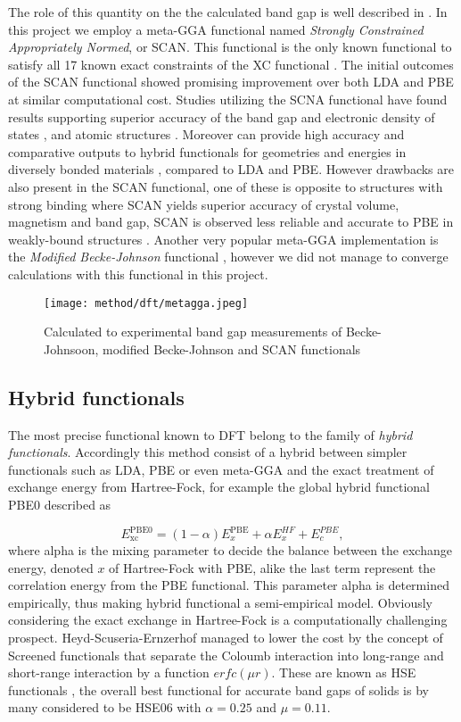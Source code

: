 The role of this quantity on the the calculated band gap is well described in \cite{xc_kineticEnergy}. In this project we employ a meta-GGA functional named \textit{Strongly Constrained Appropriately Normed}, or SCAN. This functional is the only known functional to satisfy all 17 known exact constraints of the XC functional \cite{scan}. The initial outcomes of the SCAN functional showed promising improvement over both LDA and PBE at similar computational cost. Studies utilizing the SCNA functional have found results supporting superior accuracy of the band gap and electronic density of states \cite{scan_pbe}, and atomic structures \cite{scan_hse06}. Moreover can provide high accuracy and comparative outputs to hybrid functionals for geometries and energies in diversely bonded materials \cite{scan_divbond}, compared to LDA and PBE. However drawbacks are also present in the SCAN functional, one of these is opposite to structures with strong binding where SCAN yields superior accuracy of crystal volume, magnetism and band gap, SCAN is observed less reliable and accurate to PBE in weakly-bound structures \cite{scan_flaw}. Another very popular meta-GGA implementation is the \textit{Modified Becke-Johnson} functional \cite{mbj}, however we did not manage to converge calculations with this functional in this project. 

\begin{figure}[H]
\centering
\texttt{[image: method/dft/metagga.jpeg]}
\caption{Calculated to experimental band gap measurements of Becke-Johnsoon, modified Becke-Johnson and SCAN functionals \cite{xc_benchmark}}
\end{figure}

\subsection{Hybrid functionals}

The most precise functional known to DFT belong to the family of \textit{hybrid functionals}. Accordingly this method consist of a hybrid between simpler functionals such as LDA, PBE or even meta-GGA and the exact treatment of exchange energy from Hartree-Fock, for example the global hybrid functional PBE0 \cite{pbe0} described as

\begin{equation}
E_\text{xc} ^\text{PBE0} = (1-\alpha)E_x ^\text{PBE} + \alpha E_x ^{HF} + E_c ^{PBE}, 
\end{equation}
 where alpha is the mixing parameter to decide the balance between the exchange energy, denoted $x$ of Hartree-Fock with PBE, alike the last term represent the correlation energy from the PBE functional. This parameter alpha is determined empirically, thus making hybrid functional a semi-empirical model. Obviously considering the exact exchange in Hartree-Fock is a computationally challenging prospect. Heyd-Scuseria-Ernzerhof managed to lower the cost by the concept of Screened functionals that separate the Coloumb interaction into long-range and short-range interaction by a function $erfc(\mu r)$. These are known as HSE functionals \cite{hse}, the overall best functional for accurate band gaps of solids is by many considered to be HSE06 \cite{hse06} with $\alpha = 0.25$ and $\mu = 0.11$.  
 
